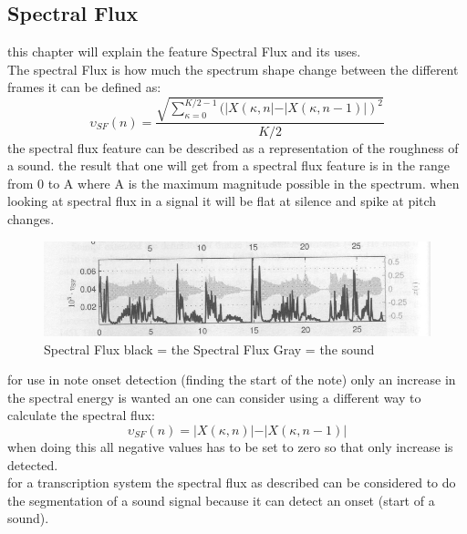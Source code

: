 \subsection{Spectral Flux}
this chapter will explain the feature Spectral Flux and its uses.\\
The spectral Flux is how much the spectrum shape change between the different frames it can be defined as\citep{ACA}:
\begin{equation}\label{Spectral Flux eq}
	\upsilon_{SF}(n) = \frac{\sqrt{\displaystyle\sum_{\kappa=0}^{K/2-1}(\vert X(\kappa,n\vert-\vert X(\kappa,n-1)\vert)^2}}{K/2}
\end{equation} 
the spectral flux feature can be described as a representation of the roughness of a sound. the result that one will get from a spectral flux feature is in the range from 0 to A where A is the maximum magnitude possible in the spectrum\citep{ACA}. when looking at spectral flux in a signal it will be flat at silence and spike at pitch changes\citep{ACA}.
\begin{figure}[h]
	\begin{center}
		\includegraphics[scale = 0.5]{fig/spectral_flux.jpg}
		\caption{Spectral Flux black = the Spectral Flux Gray = the sound \citep{ACA}}
		\label{Spectral flux pic}
	\end{center}
\end{figure}
for use in note onset detection (finding the start of the note) only an increase in the spectral energy is wanted an one can consider using a different way to calculate the spectral flux\citep{ACA}:
\begin{equation}
	\upsilon_{SF}(n) = \vert X(\kappa,n)\vert-\vert X(\kappa,n-1)\vert
\end{equation}
when doing this all negative values has to be set to zero so that only increase is detected\citep{ACA}.
\\
for a transcription system the spectral flux as described can be considered to do the segmentation of a sound signal because it can detect an onset (start of a sound). 
 

